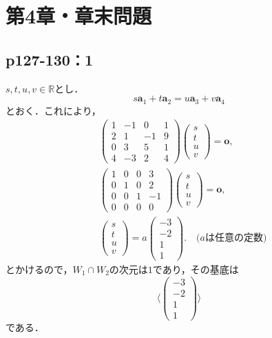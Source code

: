 \documentclass[uplatex,dvipdfmx,a4paper,10pt,fleqn]{jsarticle}
\begin{document}
\section*{第4章・章末問題}


\subsection*{p127-130：1}

\begin{tleftbar}
$s,t,u,v \in \mathbb{R}$とし．
\[
s\bm{a}_1+t\bm{a}_2=u\bm{a}_3+v\bm{a}_4
\]
とおく．これにより，
\begin{align*}
    &
\begin{pmatrix}
1 & -1 & 0 & 1 \\
2 & 1 & -1 & 9 \\
0 & 3 & 5 & 1 \\
4 & -3 & 2 & 4 
\end{pmatrix}
\begin{pmatrix}
s \\
t \\
u \\
v 
\end{pmatrix}
=\bm{o} ,\\
& 
\begin{pmatrix}
1 & 0 & 0 & 3 \\
0 & 1 & 0 & 2 \\
0 & 0 & 1 & -1 \\
0 & 0 & 0 & 0 
\end{pmatrix}
\begin{pmatrix}
s \\
t \\
u \\
v 
\end{pmatrix}
=\bm{o} ,\\
&
\begin{pmatrix}
s \\
t \\
u \\
v 
\end{pmatrix}
=a
\begin{pmatrix}
-3 \\
-2 \\
1 \\
1 
\end{pmatrix}
. \quad \text{($a$は任意の定数)}
\end{align*}
とかけるので，$W_1 \cap W_2$の次元は$1$であり，その基底は
\[
    \langle 
        \begin{pmatrix}
        -3 \\
        -2 \\
        1 \\
        1 
        \end{pmatrix}
    \rangle 
\]
である．
\end{tleftbar}
\newpage 
\end{document}
